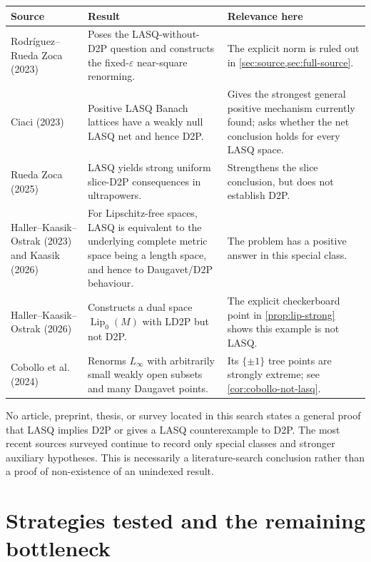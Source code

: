 \documentclass[11pt]{article}
\newcommand{\eps}{\varepsilon}
\newcommand{\Lip}{\operatorname{Lip}}
\begin{document}
\begin{center}
\begin{tabularx}{\textwidth}{@{}>{\raggedright\arraybackslash}p{}X>{\raggedright\arraybackslash}p{}@{}}
\toprule
Source & Result & Relevance here\\
\midrule
Rodr\'iguez--Rueda Zoca (2023) \cite{RodriguezRueda2023} & Poses the LASQ-without-D2P question and constructs the fixed-$\eps$ near-square renorming. & The explicit norm is ruled out in \cref{sec:source,sec:full-source}.\\
Ciaci (2023) \cite{Ciaci2023} & Positive LASQ Banach lattices have a weakly null LASQ net and hence D2P. & Gives the strongest general positive mechanism currently found; asks whether the net conclusion holds for every LASQ space.\\
Rueda Zoca (2025) \cite{RuedaZoca2025} & LASQ yields strong uniform slice-D2P consequences in ultrapowers. & Strengthens the slice conclusion, but does not establish D2P.\\
Haller--Kaasik--Ostrak (2023) and Kaasik (2026) \cite{HKO2023,KaasikThesis2026} & For Lipschitz-free spaces, LASQ is equivalent to the underlying complete metric space being a length space, and hence to Daugavet/D2P behaviour. & The problem has a positive answer in this special class.\\
Haller--Kaasik--Ostrak (2026) \cite{HallerKaasikOstrak2026} & Constructs a dual space $\Lip_0(M)$ with LD2P but not D2P. & The explicit checkerboard point in \cref{prop:lip-strong} shows this example is not LASQ.\\
Cobollo et al. (2024) \cite{CobolloEtAl2024} & Renorms $L_\infty$ with arbitrarily small weakly open subsets and many Daugavet points. & Its $\{\pm1\}$ tree points are strongly extreme; see \cref{cor:cobollo-not-lasq}.\\
\bottomrule
\end{tabularx}
\end{center}

No article, preprint, thesis, or survey located in this search states a general proof that LASQ implies D2P or gives a LASQ counterexample to D2P.  The most recent sources surveyed continue to record only special classes and stronger auxiliary hypotheses.  This is necessarily a literature-search conclusion rather than a proof of non-existence of an unindexed result.

\section{Strategies tested and the remaining bottleneck}
\label{sec:strategies}
\end{document}
